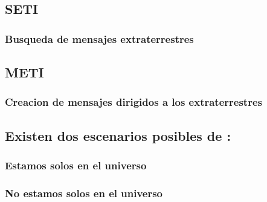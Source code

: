 \documentclass[12pt a4papel]{article}
\begin{document}
\subsection{SETI}
\subsubsection{Busqueda de mensajes extraterrestres}
\subsection{METI}
\subsubsection{Creacion de mensajes dirigidos a los extraterrestres}
\subsection{Existen dos escenarios posibles de :}
\subsubsection{Estamos solos en el universo}
\subsubsection{No estamos solos en el universo}
\end{document}
